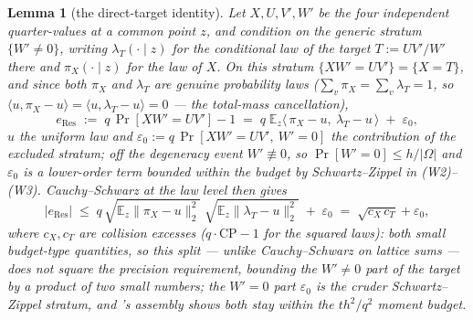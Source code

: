 \documentclass{article}
\newtheorem{lemma}[theorem]{Lemma}
\theoremstyle{definition}
\begin{document}
\begin{lemma}[the direct-target identity]\label{lem:target}
Let $X, U, V', W'$ be the four independent quarter-values at a common point $z$, and condition on the generic stratum $\{W' \neq 0\}$, writing $\lambda_T(\cdot \mid z)$ for the conditional law of the target $T := U V'/W'$ there and $\pi_X(\cdot \mid z)$ for the law of $X$. On this stratum $\{X W' = UV'\} = \{X = T\}$, and since both $\pi_X$ and $\lambda_T$ are genuine probability laws ($\sum_v \pi_X = \sum_v \lambda_T = 1$, so $\langle u, \pi_X - u\rangle = \langle u, \lambda_T - u\rangle = 0$ --- the total-mass cancellation),
\[
e_{\mathrm{Res}} \;:=\; q\,\Pr[XW' = UV'] - 1 \;=\; q\;\mathbb{E}_z\big\langle\, \pi_X - u,\ \lambda_T - u \,\big\rangle \;+\; \varepsilon_{0} ,
\]
$u$ the uniform law and $\varepsilon_0 := q\,\Pr[XW' = UV',\ W' = 0]$ the contribution of the excluded stratum; off the degeneracy event $W' \not\equiv 0$, so $\Pr[W' = 0] \leq h/|\Omega|$ and $\varepsilon_0$ is a lower-order term bounded within the budget by Schwartz--Zippel in (W2)--(W3). Cauchy--Schwarz \emph{at the law level} then gives
\[
|e_{\mathrm{Res}}| \;\leq\; q\,\sqrt{\mathbb{E}_z\|\pi_X - u\|_2^2}\; \sqrt{\mathbb{E}_z\|\lambda_T - u\|_2^2} \;+\; \varepsilon_0 \;=\; \sqrt{c_X\, c_T} + \varepsilon_0 ,
\]
where $c_X, c_T$ are \emph{collision excesses} ($q \cdot \mathrm{CP} - 1$ for the squared laws): both small budget-type quantities, so this split --- unlike Cauchy--Schwarz on lattice sums --- does \emph{not} square the precision requirement, bounding the $W' \neq 0$ part of the target by a product of two small numbers; the $W' = 0$ part $\varepsilon_0$ is the cruder Schwartz--Zippel stratum, and 's assembly shows both stay within the $t h^2/q^2$ moment budget.
\end{lemma}
\end{document}

